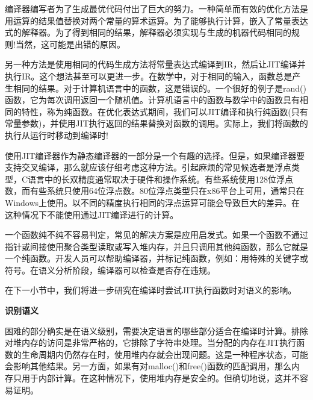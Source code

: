 编译器编写者为了生成最优代码付出了巨大的努力。一种简单而有效的优化方法是用运算的结果值替换对两个常量的算术运算。为了能够执行计算，嵌入了常量表达式的解释器。为了得到相同的结果，解释器必须实现与生成的机器代码相同的规则!当然，这可能是出错的原因。\par

另一种方法是使用相同的代码生成方法将常量表达式编译到IR，然后让JIT编译并执行IR。这个想法甚至可以更进一步。在数学中，对于相同的输入，函数总是产生相同的结果。对于计算机语言中的函数，这是错误的。一个很好的例子是rand()函数，它为每次调用返回一个随机值。计算机语言中的函数与数学中的函数具有相同的特性，称为纯函数。在优化表达式期间，我们可以JIT编译和执行纯函数(只有常量参数)，并使用JIT执行返回的结果替换对函数的调用。实际上，我们将函数的执行从运行时移动到编译时!\par

\begin{tcolorbox}[colback=blue!5!white,colframe=blue!75!black, title=交叉编译]
使用JIT编译器作为静态编译器的一部分是一个有趣的选择。但是，如果编译器要支持交叉编译，那么就应该仔细考虑这种方法。引起麻烦的常见候选者是浮点类型，C语言中的长双精度通常取决于硬件和操作系统。有些系统使用128位浮点数，而有些系统只使用64位浮点数。80位浮点类型只在x86平台上可用，通常只在Windows上使用。以不同的精度执行相同的浮点运算可能会导致巨大的差异。在这种情况下不能使用通过JIT编译进行的计算。
\end{tcolorbox}

一个函数纯不纯不容易判定，常见的解决方案是应用启发式。如果一个函数不通过指针或间接使用聚合类型读取或写入堆内存，并且只调用其他纯函数，那么它就是一个纯函数。开发人员可以帮助编译器，并标记纯函数，例如：用特殊的关键字或符号。在语义分析阶段，编译器可以检查是否存在违规。\par

在下一小节中，我们将进一步研究在编译时尝试JIT执行函数时对语义的影响。\par

\hspace*{\fill} \par %
\textbf{识别语义}

困难的部分确实是在语义级别，需要决定语言的哪些部分适合在编译时计算。排除对堆内存的访问是非常严格的，它排除了字符串处理。当分配的内存在JIT执行函数的生命周期内仍然存在时，使用堆内存就会出现问题。这是一种程序状态，可能会影响其他结果。另一方面，如果有对malloc()和free()函数的匹配调用，那么内存只用于内部计算。在这种情况下，使用堆内存是安全的。但确切地说，这并不容易证明。\par

